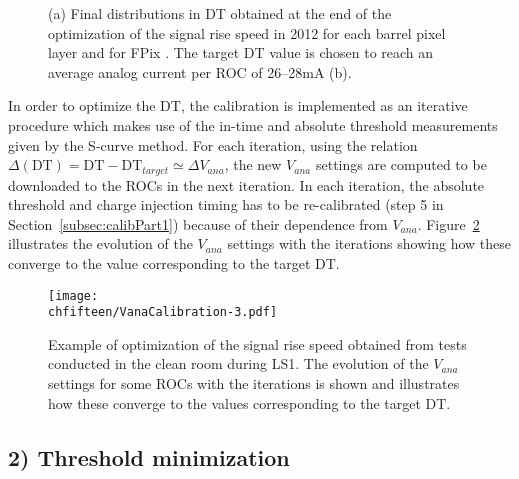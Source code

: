 \begin{figure}[!htb]
 \begin{center}
 \end{center}
 \caption{(a) Final distributions in DT obtained at the end of the optimization of the signal rise speed in 2012 for each barrel pixel layer and for FPix . The target DT value is chosen to reach an average analog current per ROC of 26--28\unit{mA} (b).}
 \label{fig:VanaCalib2012}
\end{figure}

In order to optimize the DT, the calibration is implemented as an iterative procedure which makes use of the in-time and absolute threshold measurements given by the S-curve method.
For each iteration, using the relation $\Delta(\mathrm{DT}) = \mathrm{DT} - \mathrm{DT}_{target} \simeq \Delta{V_{ana}}$, the new $V_{ana}$ settings are computed to be downloaded to the ROCs in the next iteration.
In each iteration, the absolute threshold and charge injection timing has to be re-calibrated (step 5 in Section~\ref{subsec:calibPart1}) because of their dependence from $V_{ana}$. 
Figure~\ref{fig:VanaCalib} illustrates the evolution of the $V_{ana}$ settings with the iterations showing how these converge to the value corresponding to the target DT.

\begin{figure}[!htb]
\begin{center}
 \texttt{[image: \\chfifteen/VanaCalibration-3.pdf]}
 \end{center}
 \caption{Example of optimization of the signal rise speed obtained from tests conducted in the clean room during LS1. The evolution of the $V_{ana}$ settings for some ROCs with the iterations is shown and illustrates how these converge to the values corresponding to the target DT. }
 \label{fig:VanaCalib}
\end{figure}

\subsection*{2) Threshold minimization}

